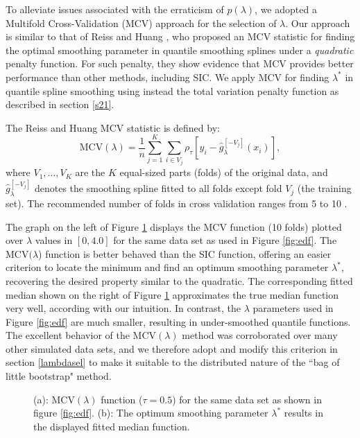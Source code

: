 \documentclass{statsoc}
\begin{document}
To alleviate issues associated with the erraticism of $p(\lambda)$, we adopted a Multifold Cross-Validation (MCV) approach for the selection of $\lambda$. Our approach is similar to that of Reiss and Huang \citep{reiss2012smoothness}, who proposed an MCV statistic for finding the optimal smoothing parameter in quantile smoothing splines under a {\it quadratic} penalty function. For such penalty, they show evidence that MCV provides better performance than other methods, including SIC. We apply MCV for finding $\lambda^*$ in quantile spline smoothing using instead the total variation penalty function as described in section \ref{s21}.
  
The Reiss and Huang MCV statistic is defined by:
\begin{equation}
    \mbox{MCV}(\lambda)=\frac{1}{n}\sum_{j=1}^{K} \sum_{i\in V_j} \rho_{\tau}[y_i-\hat{g}_{\lambda}^{[-V_j]}(x_i)],
    \label{MCV}
\end{equation}
where $V_1, \ldots, V_{K}$ are the $K$ equal-sized parts (folds) of the original data, and $\hat{g}_{\lambda}^{[-V_j]}$ denotes the smoothing spline fitted to all folds except fold $V_j$ (the training set). The recommended number of folds in cross validation ranges from 5 to 10 \citep{reiss2012smoothness}.  

The graph on the left of Figure \ref{fig:fitted} displays the MCV function (10 folds) plotted over $\lambda$ values in $[0,4.0]$ for the same data set as used in Figure \ref{fig:edf}. The MCV$(\lambda$) function is  {better behaved than the SIC function, offering an easier criterion to locate the minimum and find an optimum smoothing parameter $\lambda^*$, recovering the desired property similar to the quadratic}. The corresponding fitted median shown on the right of Figure \ref{fig:fitted} approximates the true median function very well, according with our intuition. In contrast, the $\lambda$ parameters used in Figure \ref{fig:edf} are much smaller, resulting in under-smoothed quantile functions. The excellent behavior of the MCV$(\lambda)$ method was corroborated over many other simulated data sets, and we therefore adopt and modify this criterion in section \ref{lambdasel} to make it suitable to the distributed nature of the ``bag of little bootstrap" method. 
\begin{figure}
\centering   
\caption{ {(a): MCV$(\lambda)$ function ($\tau=0.5$) for the same data set as shown in figure \ref{fig:edf}. (b): The optimum smoothing parameter $\lambda^*$ results in the displayed fitted median function.}}
    \label{fig:fitted}
\end{figure}
\end{document}
